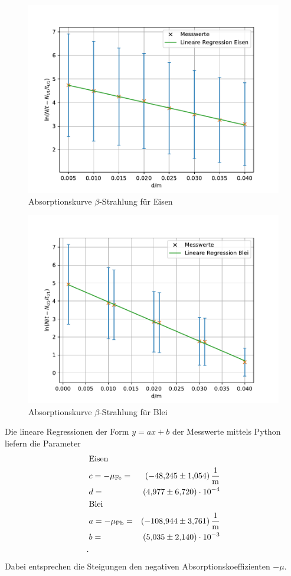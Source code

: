 \begin{figure}[h!]
  \centering
  \includegraphics[width=\textwidth]{fe.pdf}
  \caption{Absorptionskurve $\beta$-Strahlung für Eisen}
  \label{fig:fe}
\end{figure}
\begin{figure}[h!]
  \centering
  \includegraphics[width=\textwidth]{pb.pdf}
  \caption{Absorptionskurve $\beta$-Strahlung für Blei}
  \label{fig:pb}
\end{figure}


Die lineare Regressionen der Form $y=ax+b$ der Messwerte mittels Python liefern die Parameter
\begin{align*}
  &\text{Eisen}   &   \\
  &c= -\mu_{\text{Fe}} = &\SI{-48.245 \pm 1.054}{\frac{1}{m}}\\
  &d= &\SI{4.977 \pm 6.72e-04}{}\\
  &\text{Blei}    &   \\
  &a= -\mu_{\text{Pb}} = &\SI{-108.944 \pm 3.761}{\frac{1}{m}}\\
  &b= &\SI{5.035 \pm 2.14e-03}{}\\.
\end{align*}
Dabei entsprechen die Steigungen den negativen Absorptionskoeffizienten $-\mu$.
\FloatBarrier

